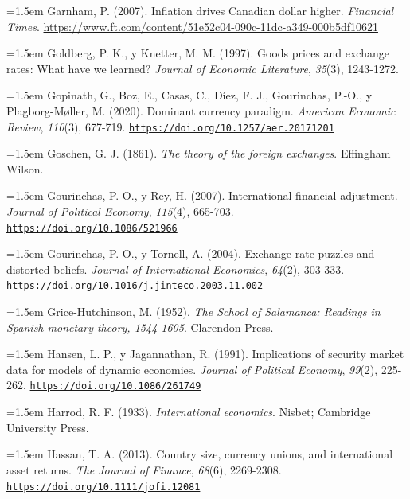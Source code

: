 \documentclass[10pt,a4paper]{article}
\begin{document}
\noindent\hangindent=1.5em Garnham, P. (2007). Inflation drives Canadian dollar higher. \textit{Financial Times}. \href{https://www.ft.com/content/51e52c04-090c-11dc-a349-000b5df10621}{https://www.ft.com/content/51e52c04-090c-11dc-a349-000b5df10621}

\noindent\hangindent=1.5em Goldberg, P. K., y Knetter, M. M. (1997). Goods prices and exchange rates: What have we learned? \textit{Journal of Economic Literature}, \textit{35}(3), 1243-1272.

\noindent\hangindent=1.5em Gopinath, G., Boz, E., Casas, C., Díez, F. J., Gourinchas, P.-O., y Plagborg-Møller, M. (2020). Dominant currency paradigm. \textit{American Economic Review}, \textit{110}(3), 677-719. \href{https://doi.org/10.1257/aer.20171201}{\nolinkurl{https://doi.org/10.1257/aer.20171201}}

\noindent\hangindent=1.5em Goschen, G. J. (1861). \textit{The theory of the foreign exchanges}. Effingham Wilson.

\noindent\hangindent=1.5em Gourinchas, P.-O., y Rey, H. (2007). International financial adjustment. \textit{Journal of Political Economy}, \textit{115}(4), 665-703. \href{https://doi.org/10.1086/521966}{\nolinkurl{https://doi.org/10.1086/521966}}

\noindent\hangindent=1.5em Gourinchas, P.-O., y Tornell, A. (2004). Exchange rate puzzles and distorted beliefs. \textit{Journal of International Economics}, \textit{64}(2), 303-333. \href{https://doi.org/10.1016/j.jinteco.2003.11.002}{\nolinkurl{https://doi.org/10.1016/j.jinteco.2003.11.002}}

\noindent\hangindent=1.5em Grice-Hutchinson, M. (1952). \textit{The School of Salamanca: Readings in Spanish monetary theory, 1544-1605}. Clarendon Press.

\noindent\hangindent=1.5em Hansen, L. P., y Jagannathan, R. (1991). Implications of security market data for models of dynamic economies. \textit{Journal of Political Economy}, \textit{99}(2), 225-262. \href{https://doi.org/10.1086/261749}{\nolinkurl{https://doi.org/10.1086/261749}}

\noindent\hangindent=1.5em Harrod, R. F. (1933). \textit{International economics}. Nisbet; Cambridge University Press.

\noindent\hangindent=1.5em Hassan, T. A. (2013). Country size, currency unions, and international asset returns. \textit{The Journal of Finance}, \textit{68}(6), 2269-2308. \href{https://doi.org/10.1111/jofi.12081}{\nolinkurl{https://doi.org/10.1111/jofi.12081}}
\end{document}
